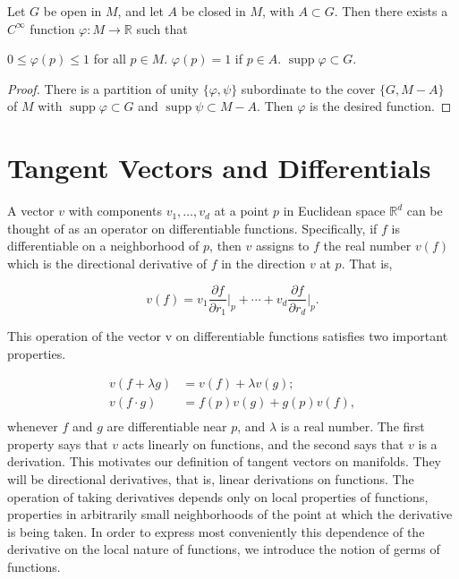 \begin{corollary*}
	Let $G$ be open in $M$, and let $A$ be closed in $M$, with $A \subset G$. Then there exists a $C^{\infty}$ function $\varphi: M \to \mathbb{R}$ such that
	\begin{enumerate}
		  $ 0 \leq \varphi(p) \leq 1 $ for all  $ p \in M $.
		  $ \varphi(p) = 1 $ if  $ p \in A $.
		 $\operatorname{supp}\varphi \subset G$.
	\end{enumerate}
\end{corollary*}

\begin{proof}
	There is a partition of unity $\{\varphi, \psi\}$ subordinate to the cover
	$\{G, M - A\}$ of $M$ with $\operatorname{supp} \varphi \subset G$ and
	$\operatorname{supp} \psi \subset M - A$. Then $\varphi$ is the desired function.
\end{proof}

\section{Tangent Vectors and Differentials}

\label{thm:1.12}
A vector $v$ with components $v_{1}, \ldots, v_{d}$ at a
point $p$ in Euclidean space $\mathbb{R}^{d}$ can be
thought of as an operator on differentiable functions.
Specifically, if $f$ is differentiable on a neighborhood of $p$,
then $v$ assigns to $f$ the real number $v(f)$ which is the
directional derivative of $f$ in the direction $v$ at $p$. That is,

\begin{equation}
	\tag{1}\label{eq:1.12:1}
	v(f)=v_{1}\frac{\partial f}{\partial r_{1}}\bigg|_{p}+\cdots+v_{d}\frac{\partial f}{\partial r_{d}}\bigg|_{p}.
\end{equation}

This operation of the vector v on differentiable functions satisfies two important properties.

\begin{equation}
	\tag{2}\label{eq:1.12:2}%
	\begin{aligned}{v(f+\lambda g)}&{{}=v(f)+\lambda v(g);}\\ {v(f\cdot g)}&{{}=f(p)v(g)+g(p)v(f),}\\ \end{aligned}
\end{equation}
whenever $f$ and $g$ are differentiable near $p$, and $\lambda$ is a real number.
The first property says that $v$ acts linearly on functions,
and the second says that $v$ is a derivation. This motivates our
definition of tangent vectors on manifolds. They will be directional derivatives,
that is, linear derivations on functions. The operation of taking derivatives
depends only on local properties of functions, properties in arbitrarily small
neighborhoods of the point at which the derivative is being taken. In order
to express most conveniently this dependence of the derivative on the
local nature of functions, we introduce the notion of germs of functions.

